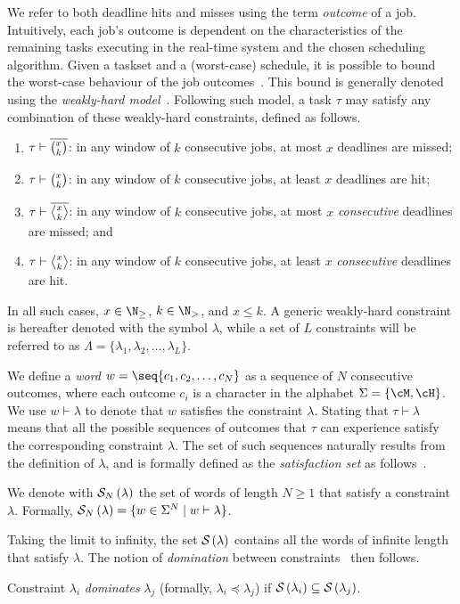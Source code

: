 We refer to both deadline hits and misses using the term \emph{outcome} of a job.
Intuitively, each job's outcome is dependent on the characteristics of the remaining tasks executing in the real-time system and the chosen scheduling algorithm.
Given a taskset and a (worst-case) schedule, it is possible to bound the worst-case behaviour of the job outcomes~\cite{Bernat:2001, Ernst:2015}.
This bound is generally denoted using the \emph{weakly-hard model}~\cite{Bernat:2001}.
Following such model, a task $\tau$ may satisfy any combination of these weakly-hard constraints, defined as follows.
\begin{enumerate}[label=(\roman*)]
    \item \label{item:mk} $\tau \vdash \overline{\binom{x_{}}{k_{}}}$: in any window of $k$ consecutive jobs, at most $x$ deadlines are missed;
    \item \label{item:hk} $\tau \vdash \binom{x_{}}{k_{}}$: in any window of $k$ consecutive jobs, at least $x$ deadlines are hit;
    \item \label{item:cons} $\tau \vdash \rowmiss{}$: in any window of $k$ consecutive jobs, at most $x$ \emph{consecutive} deadlines are missed; and
    \item $\tau \vdash \rowhit{}$: in any window of $k$ consecutive jobs, at least $x$ \emph{consecutive} deadlines are hit.
\end{enumerate}
In all such cases, $x\in \N_{\geq}$, $k \in \N_{>}$, and $x\leq k$.
A generic weakly-hard constraint is hereafter denoted with the symbol $\lambda$, while a set of $L$ constraints will be referred to as $\Lambda = \{ \lambda_1, \lambda_2, \dots, \lambda_L \}$.

We define a \emph{word} $w= \seq{c_1, c_2, \dots, c_N}$ as a sequence of $N$ consecutive outcomes, where each outcome $c_i$ is a character in the alphabet $\Sigma = \{\cM, \cH\}$.
We use $w \vdash \lambda$ to denote that $w$ satisfies the constraint $\lambda$. 
Stating that $\tau \vdash \lambda$ means that all the possible sequences of outcomes that $\tau$ can experience satisfy the corresponding constraint $\lambda$.
The set of such sequences naturally results from the definition of $\lambda$, and is formally defined as the \emph{satisfaction set} as follows~\cite{Bernat:2001}.

\begin{definition}%
    \label{def:satisfaction}%
    We denote with $\mathcal{S}_{N}\left( \lambda \right)$ the set of words of length $N \geq 1$ that satisfy a constraint $\lambda$.
    Formally, $\mathcal{S}_{N}\left( \lambda \right) = \{ w \in \Sigma^N \mid w \vdash \lambda \}$.
\end{definition}
Taking the limit to infinity, the set $\mathcal{S}_{}\left( \lambda \right)$ contains all the words of infinite length that satisfy $\lambda$.
The notion of \emph{domination} between constraints~\cite{Bernat:2001} then follows.
\begin{definition}%
    \label{def:domination}%
    Constraint $\lambda_i$ \emph{dominates} $\lambda_j$ (formally, $\lambda_i \preceq \lambda_j$) if $\mathcal{S}_{}\left( \lambda_i \right) \subseteq \mathcal{S}_{}\left( \lambda_j \right)$. 
\end{definition}


